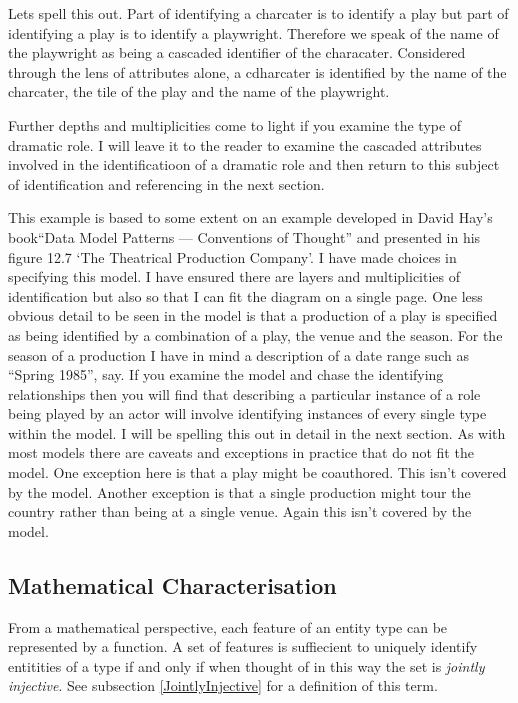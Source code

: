 Lets spell this out. Part of identifying a charcater is to identify a play but part of identifying a play is to identify a playwright. Therefore we speak of the name of the playwright as being a cascaded identifier of the characater. Considered through the lens of attributes alone, a cdharcater is identified by the name of the charcater, the tile of the play and the name of the playwright. 

Further depths and multiplicities come to light if you examine the type of dramatic role. I will leave it to the reader to examine the cascaded attributes involved in the identificatioon of a dramatic role and then return to this subject of identification and referencing in the next section.

{This example is based to some extent on an example developed 
in David Hay's book``Data Model Patterns --- Conventions of Thought''
and presented in his figure 12.7 `The Theatrical Production Company'.
I have made choices in specifying this model.
I have ensured there are layers and multiplicities of identification but also so that I can fit the diagram on a single page. 
One less obvious detail to be seen in the model is that a production of a play is specified as 
being identified by a combination of a play, the venue and the season.
For the season of a production I have in mind a description of a date range such as  ``Spring 1985'', say. 
If you examine the model and chase the identifying relationships
then you will find that describing a particular instance of a role being played by an actor will involve identifying
instances of every single type within the model. I will be spelling this out in detail in the next section.
As with most models there are caveats and exceptions in practice that do not fit the model. 
One exception here is that a play might be coauthored. This isn't covered by the model.
Another exception is that a single production might tour the country rather than being at a single venue. Again this isn't covered by the model. }

\subsection {Mathematical Characterisation}
\mynote From a mathematical perspective, 
each feature of an entity type can be represented by a function. A set of features is suffiecient to uniquely identify entitities of a type if and only if when thought  of in this way the set is \textit{jointly injective}.   
See subsection \ref{JointlyInjective} for a definition of this term.

